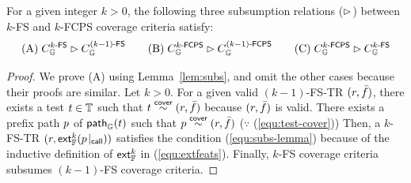\begin{theorem}\label{thm:subs}
  For a given integer $k > 0$, the following three subsumption relations
  ($\rhd$) between $k$-FS and $k$-FCPS coverage criteria satisfy:
  \[
    \text{(A)} \; C_{\mathbb{G}}^{{k}\textsf{-FS}} \rhd C_{\mathbb{G}}^{{(k-1)}\textsf{-FS}} \qquad
    \text{(B)} \; C_{\mathbb{G}}^{{k}\textsf{-FCPS}} \rhd C_{\mathbb{G}}^{{(k-1)}\textsf{-FCPS}} \qquad
    \text{(C)} \; C_{\mathbb{G}}^{{k}\textsf{-FCPS}} \rhd C_{\mathbb{G}}^{{k}\textsf{-FS}}
  \]
\end{theorem}

\begin{proof}
  We prove (A) using Lemma~\ref{lem:subs}, and omit
  the other cases because their proofs are similar.
  Let $k > 0$.
  For a given valid $(k-1)$-FS-TR $(r, \bar{f})$, there exists a test $t
  \in \mathbb{T}$ such that $t \overset{\textsf{cover}}{\sim} (r, \bar{f})$ because $(r, \bar{f})$
  is valid.
  There exists a prefix path $p$ of $\textsf{path}_{\mathbb{G}}(t)$ such that $p
  \overset{\textsf{cover}}{\sim} (r, \bar{f})$ ($\because$ (\ref{equ:test-cover}))
  Then, a $k$-FS-TR $(r, \textsf{ext}_{\mathbb{F}}^{k}({p}\!\mid_{\textsf{call}}))$ satisfies the condition
  (\ref{equ:subs-lemma}) because of the inductive definition of $\textsf{ext}_{\mathbb{F}}^{k}$
  in (\ref{equ:extfeats}).
  Finally, $k$-FS coverage criteria subsumes $(k-1)$-FS coverage criteria.
\end{proof}
